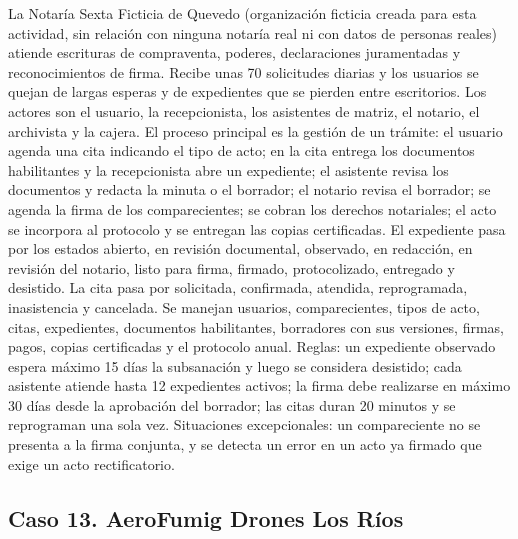 \documentclass[11pt]{article}
\newcommand{\subseccion}[1]{\subsection{\textcolor{midblue}{#1}}}
\begin{document}
La Notaría Sexta Ficticia de Quevedo (organización ficticia creada para esta actividad, sin relación con ninguna notaría real ni con datos de personas reales) atiende escrituras de compraventa, poderes, declaraciones juramentadas y reconocimientos de firma. Recibe unas 70 solicitudes diarias y los usuarios se quejan de largas esperas y de expedientes que se pierden entre escritorios. Los actores son el usuario, la recepcionista, los asistentes de matriz, el notario, el archivista y la cajera. El proceso principal es la gestión de un trámite: el usuario agenda una cita indicando el tipo de acto; en la cita entrega los documentos habilitantes y la recepcionista abre un expediente; el asistente revisa los documentos y redacta la minuta o el borrador; el notario revisa el borrador; se agenda la firma de los comparecientes; se cobran los derechos notariales; el acto se incorpora al protocolo y se entregan las copias certificadas. El expediente pasa por los estados abierto, en revisión documental, observado, en redacción, en revisión del notario, listo para firma, firmado, protocolizado, entregado y desistido. La cita pasa por solicitada, confirmada, atendida, reprogramada, inasistencia y cancelada. Se manejan usuarios, comparecientes, tipos de acto, citas, expedientes, documentos habilitantes, borradores con sus versiones, firmas, pagos, copias certificadas y el protocolo anual. Reglas: un expediente observado espera máximo 15 días la subsanación y luego se considera desistido; cada asistente atiende hasta 12 expedientes activos; la firma debe realizarse en máximo 30 días desde la aprobación del borrador; las citas duran 20 minutos y se reprograman una sola vez. Situaciones excepcionales: un compareciente no se presenta a la firma conjunta, y se detecta un error en un acto ya firmado que exige un acto rectificatorio.

\subseccion{Caso 13. AeroFumig Drones Los Ríos}
\end{document}
